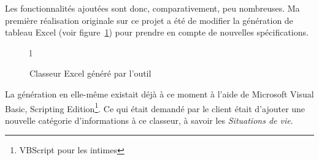 Les fonctionnalités ajoutées sont donc, comparativement, peu nombreuses. Ma première réalisation originale sur ce projet a été de modifier la génération de tableau Excel (voir figure~\ref{fig:classeur}) pour prendre en compte de nouvelles spécifications.

\begin{figure}{l}
	\caption{Classeur Excel généré par l'outil}
	\label{fig:classeur}
\end{figure}

La génération en elle-même existait déjà à ce moment à l'aide de Microsoft Visual Basic, Scripting Edition\cite{vbscript}\footnote{VBScript pour les intimes}. Ce qui était demandé par le client était d'ajouter une nouvelle catégorie d'informations à ce classeur, à savoir les \emph{Situations de vie}.

